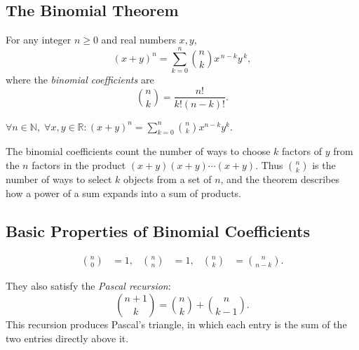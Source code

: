 
\subsection{The Binomial Theorem}
\label{sec:binomial-theorem}

\begin{theorem}
\label{thm:binomial}
For any integer \(n \ge 0\) and real numbers \(x,y\),
\[
(x+y)^n
=
\sum_{k=0}^{n} \binom{n}{k} x^{\,n-k} y^{\,k},
\]
where the \emph{binomial coefficients} are
\[
\binom{n}{k}
=
\frac{n!}{k!(n-k)!}.
\]
\end{theorem}

\NoLocalDependencies

\begin{remark*}
\(\forall n \in \mathbb{N},\; \forall x,y \in \mathbb{R}: \displaystyle(x+y)^n = \sum_{k=0}^{n}\binom{n}{k}x^{n-k}y^{k}\).
\end{remark*}

\begin{remark*}
The binomial coefficients count the number of ways to choose \(k\) factors of
\(y\) from the \(n\) factors in the product \((x+y)(x+y)\cdots(x+y)\).
Thus \(\binom{n}{k}\) is the number of ways to select \(k\) objects from a
set of \(n\), and the theorem describes how a power of a sum expands into
a sum of products.
\end{remark*}

\subsection*{Basic Properties of Binomial Coefficients}

\begin{remark*}
\begin{align*}
\binom{n}{0} &= 1, &
\binom{n}{n} &= 1, &
\binom{n}{k} &= \binom{n}{n-k}.
\end{align*}

They also satisfy the \emph{Pascal recursion}:
\[
\binom{n+1}{k}
=
\binom{n}{k}+\binom{n}{k-1}.
\]
This recursion produces Pascal's triangle, in which each entry is the
sum of the two entries directly above it.
\end{remark*}

